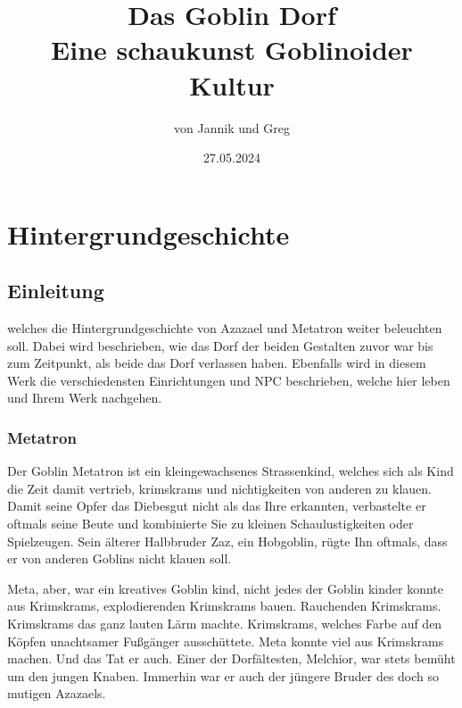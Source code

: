 \documentclass[letterpaper,twocolumn,openany,nodeprecatedcode]{book}
\title{Das Goblin Dorf\\
\large Eine schaukunst Goblinoider Kultur}
\author{von Jannik und Greg}
\date{27.05.2024}
\begin{document}
\frontmatter

\maketitle

\tableofcontents

\mainmatter%

\part{Hintergrundgeschichte}

\chapter{Einleitung}

 welches die Hintergrundgeschichte von Azazael und Metatron weiter beleuchten soll. Dabei wird beschrieben, wie das Dorf der beiden Gestalten zuvor war bis zum Zeitpunkt, als beide das Dorf verlassen haben. Ebenfalls wird in diesem Werk die verschiedensten Einrichtungen und NPC beschrieben, welche hier leben und Ihrem Werk nachgehen.

\section{Metatron}

Der Goblin Metatron ist ein kleingewachsenes Strassenkind, welches sich als Kind die Zeit damit vertrieb, krimskrams und nichtigkeiten von anderen zu klauen. Damit seine Opfer das Diebesgut nicht als das Ihre erkannten, verbastelte er oftmals seine Beute und kombinierte Sie zu kleinen Schaulustigkeiten oder Spielzeugen. Sein älterer Halbbruder Zaz, ein Hobgoblin, rügte Ihn oftmals, dass er von anderen Goblins nicht klauen soll.

Meta, aber, war ein kreatives Goblin kind, nicht jedes der Goblin kinder konnte aus Krimskrams, explodierenden Krimskrams bauen. Rauchenden Krimskrams. Krimskrams das ganz lauten Lärm machte. Krimskrams, welches Farbe auf den Köpfen unachtsamer Fußgänger ausschüttete. Meta konnte viel aus Krimskrams machen. Und das Tat er auch. Einer der Dorfältesten, Melchior, war stets bemüht um den jungen Knaben. Immerhin war er auch der jüngere Bruder des doch so mutigen Azazaels.
\end{document}
